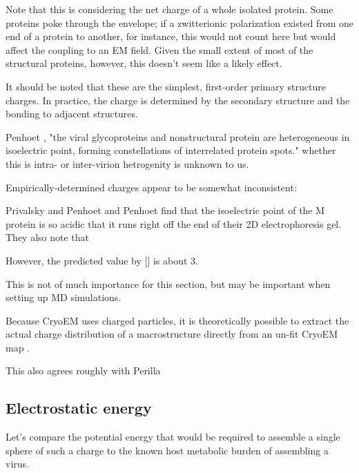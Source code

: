 \documentclass[paper.tex]{subfiles}
\begin{document}
Note that this is considering the net charge of a whole isolated protein. Some proteins poke through the envelope; if a zwitterionic polarization existed from one end of a protein to another, for instance, this would not count here but would affect the coupling to an EM field. Given the small extent of most of the structural proteins, however, this doesn't seem like a likely effect.

\begin{sidenote}
	It should be noted that these are the simplest, first-order primary structure charges. In practice, the charge is determined by the secondary structure and the bonding to adjacent structures.
	
	 Penhoet \cite{Structurea}, "the viral glycoproteins and nonstructural protein are heterogeneous in isoelectric point, forming constellations of interrelated protein spots." whether this is intra- or inter-virion hetrogenity is unknown to us. 
	
	Empirically-determined charges appear to be somewhat inconsistent:
	
	Privalsky and Penhoet \cite{Influenza1978} and Penhoet \cite{Structurea} find that the isoelectric point of the M protein is so acidic that it runs right off the end of their 2D electrophoresis gel. They also note that 
	
	However, the predicted value by [] is about 3.
	
	This is not of much importance for this section, but may be important when setting up MD simulations.
	
	Because CryoEM uses charged particles, it is theoretically possible to extract the actual charge distribution of a macrostructure directly from an un-fit CryoEM map \cite{Identification2018}. 
\end{sidenote}

This also agrees roughly with Perilla \cite{Physical2017}


\subsection{Electrostatic energy}



Let's compare the potential energy that would be required to assemble a single sphere of such a charge to the known host metabolic burden of assembling a virus.

\end{document}
